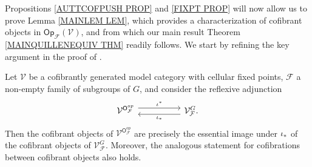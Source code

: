 \documentclass[a4paper,10pt]{article}%
\begin{document}
Propositions \ref{AUTTCOFPUSH PROP} and \ref{FIXPT PROP} will now allow us to prove Lemma \ref{MAINLEM LEM}, which provides a characterization of cofibrant objects in 
$\mathsf{Op}_{\mathcal{F}}(\mathcal{V})$,
and from which our main 
result Theorem \ref{MAINQUILLENEQUIV THM}
readily follows.
We start by refining the key argument in the proof of
\cite[Thm. 2.10]{Ste16}.


\begin{proposition}\label{COFESSIM PROP}
	Let $\mathcal{V}$ be a cofibrantly generated model category with cellular fixed points, $\mathcal{F}$ a non-empty family of subgroups of $G$,
	and consider the reflexive adjunction
\[
\begin{tikzcd}[column sep =5em]
	\mathcal{V}^{\mathsf{O}_{\mathcal{F}}^{op}}
	\ar[shift left=1.5]{r}{\iota^{\**}} 
&
	\mathcal{V}^G_{\mathcal{F}}
	\ar[shift left=1.5]{l}{\iota_{\**}}.
\end{tikzcd}
\]
Then the cofibrant objects of 
$\mathcal{V}^{\mathsf{O}_{\mathcal{F}}^{op}}$
are precisely the essential image under $\iota_{\**}$
of the cofibrant objects of
$\mathcal{V}^G_{\mathcal{F}}$.
Moreover, the analogous statement for cofibrations between cofibrant objects also holds.
\end{proposition}
\end{document}
